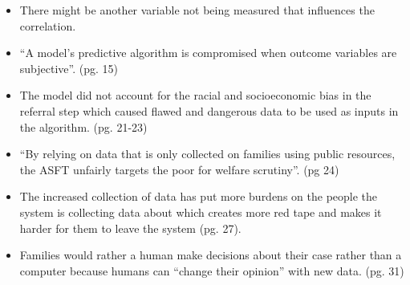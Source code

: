 \documentclass{article}
\begin{document}
\begin{itemize}
        \item There might be another variable not being measured that influences the correlation.
        \item “A model’s predictive algorithm is compromised when outcome variables are subjective”. (pg. 15)
        \item The model did not account for the racial and socioeconomic bias in the referral step which caused flawed and dangerous data to be used as inputs in the algorithm. (pg. 21-23)
        \item “By relying on data that is only collected on families using public resources, the ASFT unfairly targets the poor for welfare scrutiny”. (pg 24)
        \item The increased collection of data has put more burdens on the people the system is collecting data about which creates more red tape and makes it harder for them to leave the system (pg. 27).
        \item Families would rather a human make decisions about their case rather than a computer because humans can “change their opinion” with new data. (pg. 31) 
    \end{itemize}
\end{document}
